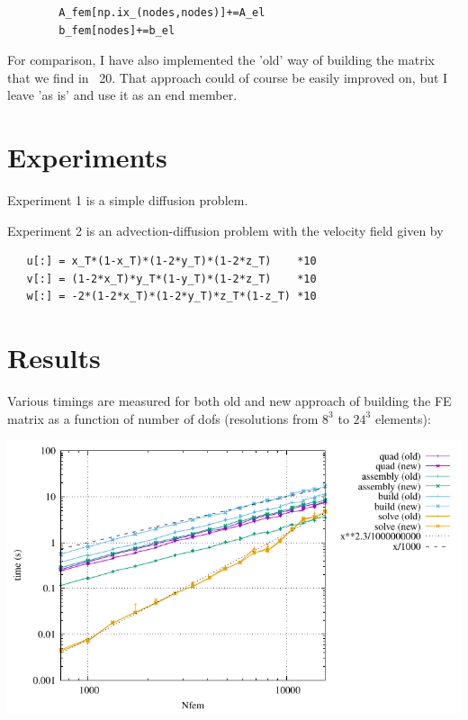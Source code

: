\begin{lstlisting}
        A_fem[np.ix_(nodes,nodes)]+=A_el
        b_fem[nodes]+=b_el
\end{lstlisting}

For comparison, I have also implemented the 'old' way of building the 
matrix that we find in \stone~20. That approach could of course be 
easily improved on, but I leave 'as is' and use it as an end member.

\section*{Experiments}

Experiment 1 is a simple diffusion problem.

Experiment 2 is an advection-diffusion problem with the velocity field given by 
\begin{lstlisting}
   u[:] = x_T*(1-x_T)*(1-2*y_T)*(1-2*z_T)    *10
   v[:] = (1-2*x_T)*y_T*(1-y_T)*(1-2*z_T)    *10
   w[:] = -2*(1-2*x_T)*(1-2*y_T)*z_T*(1-z_T) *10
\end{lstlisting}

\section*{Results}

Various timings are measured for both old and new approach 
of building the FE matrix as a function of number of dofs (resolutions 
from $8^3$ to $24^3$ elements):

\begin{center}
\includegraphics[width=15cm]{python_codes/fieldstone_177/RESULTS/times.pdf}
\end{center}

